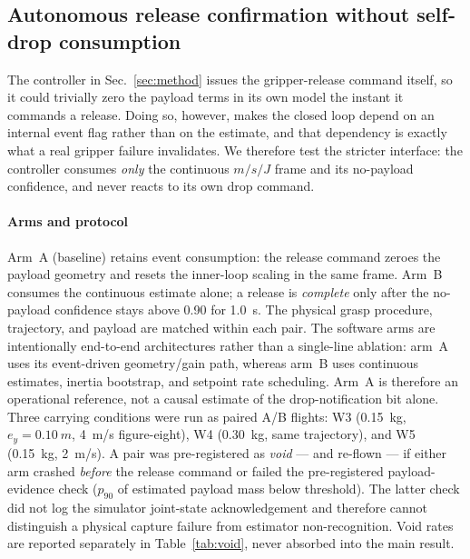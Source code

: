 \subsection{Autonomous release confirmation without self-drop consumption}
\label{sec:autorelease}

The controller in Sec.~\ref{sec:method} issues the gripper-release command itself, so it
could trivially zero the payload terms in its own model the instant it commands a release.
Doing so, however, makes the closed loop depend on an internal event flag rather than on the
estimate, and that dependency is exactly what a real gripper failure invalidates. We
therefore test the stricter interface: the controller consumes \emph{only} the continuous
$m/s/J$ frame and its no-payload confidence, and never reacts to its own drop command.

\paragraph{Arms and protocol} Arm~A (baseline) retains event consumption: the release command
zeroes the payload geometry and resets the inner-loop scaling in the same frame. Arm~B
consumes the continuous estimate alone; a release is \emph{complete} only after the
no-payload confidence stays above \num{0.90} for \SI{1.0}{s}. The physical grasp procedure,
trajectory, and payload are matched within each pair. The software arms are intentionally
end-to-end architectures rather than a single-line ablation: arm~A uses its event-driven
geometry/gain path, whereas arm~B uses continuous estimates, inertia bootstrap, and setpoint
rate scheduling. Arm~A is therefore an operational reference, not a causal estimate of the
drop-notification bit alone. Three carrying conditions were run as paired A/B flights: W3 (\SI{0.15}{kg},
$e_y=\SI{0.10}{m}$, \SI{4}{m/s} figure-eight), W4 (\SI{0.30}{kg}, same trajectory), and W5
(\SI{0.15}{kg}, \SI{2}{m/s}). A pair was pre-registered as \emph{void} --- and re-flown ---
if either arm crashed \emph{before} the release command or failed the pre-registered payload-
evidence check ($p_{90}$ of estimated payload mass below threshold). The latter check did not
log the simulator joint-state acknowledgement and therefore cannot distinguish a physical
capture failure from estimator non-recognition. Void rates are reported separately in
Table~\ref{tab:void}, never absorbed into the main result.

